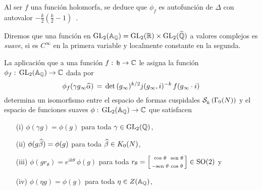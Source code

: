 %
Al ser $f$ una funci\'{o}n holomorfa, se deduce que $\phi_{f}$ es
autofunci\'{o}n de $\Delta$ con autovalor
\begin{math}
	-\frac{k}{2}\left(\frac{k}{2}-1\right)
\end{math}~.

Diremos que una funci\'{o}n en
\begin{math}
	\mathrm{GL}_{2}(\mathbb{A}_{\mathbb{Q}})=
		\mathrm{GL}_{2}(\mathbb{R})\times\mathrm{GL}_{2}(\widehat{\mathbb{Q}})
\end{math}
a valores complejos es \emph{suave},
si es $C^{\infty}$ en la primera variable y localmente constante en la segunda.

\begin{propoEquivFormaGLQIntro}%
	\label{propo:introequivformaglq}
	La aplicaci\'{o}n que a una funci\'{o}n $f:\,\mathfrak{h}\rightarrow\mathbb{C}$
	le asigna la funci\'{o}n
	$\phi_{f}:\,\mathrm{GL}_{2}(\mathbb{A}_{\mathbb{Q}})\rightarrow\mathbb{C}$ dada por
	\begin{equation}
		\label{eq:funcionadelicacorrespondienteelipticas}
		\phi_{f}(\gamma g_{\infty}\widehat{\alpha})
			\,=\,\mathrm{det}\,(g_{\infty})^{k/2}j(g_{\infty},i)^{-k}\,
				f(g_{\infty}\cdot i)
	\end{equation}
	determina un isomorfismo entre el espacio de formas cuspidales
	$\mathcal{S}^{}_{k}\left(\Gamma_{0}(N)\right)$ y el espacio de funciones suaves
	\begin{math}
		\phi:\,\mathrm{GL}_{2}(\mathbb{A}_{\mathbb{Q}})\rightarrow\mathbb{C}
	\end{math}
	que satisfacen
	\begin{itemize}
		\item[(i)] $\phi(\gamma g)=\phi(g)$ para toda
			$\gamma\in\mathrm{GL}_{2}(\mathbb{Q})$,
		\item[(ii)] $\phi(g\widehat{\beta})=\phi(g)$ para toda
			$\widehat{\beta}\in K_{0}(N)$,
		\item[(iii)] $\phi(gr_{\theta})=e^{ik\theta}\,\phi(g)$ para
			toda
			\begin{math}
				r_{\theta}=
				\left[\begin{smallmatrix}
					\mathrm{cos}\,\,\theta & \mathrm{sen}\,\,\theta\\[5pt]
					-\mathrm{sen}\,\,\theta & \mathrm{cos}\,\,\theta
				\end{smallmatrix}\right]
				\in\mathrm{SO}(2)
			\end{math}
			y
		\item[(iv)] $\phi(\eta g)=\phi(g)$ para toda
			$\eta\in Z(\mathbb{A}_{\mathbb{Q}})$,
	\end{itemize}

\end{propoEquivFormaGLQIntro}
